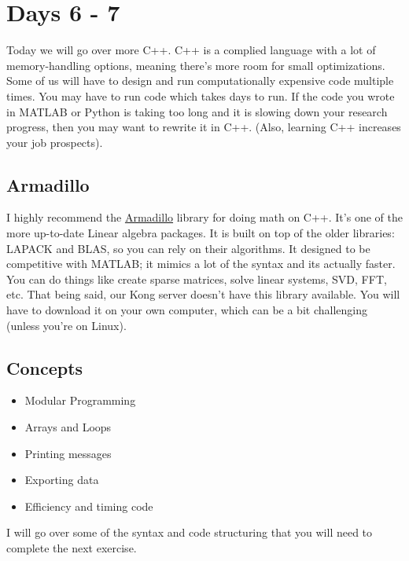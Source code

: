 \documentclass{article}
\begin{document}
\section{Days 6 - 7}
Today we will go over more C++. C++ is a complied language with a lot of memory-handling options, meaning there's more room for small optimizations. Some of us will have to design and run computationally expensive code multiple times. You may have to run code which takes days to run. If the code you wrote in MATLAB or Python is taking too long and it is slowing down your research progress, then you may want to rewrite it in C++. (Also, learning C++ increases your job prospects).

\subsection{Armadillo}
I highly recommend the \href{http://arma.sourceforge.net/}{Armadillo} library for doing math on C++. It's one of the more up-to-date Linear algebra packages. It is built on top of the older libraries: LAPACK and BLAS, so you can rely on their algorithms. It designed to be competitive with MATLAB; it mimics a lot of the syntax and its actually faster. You can do things like create sparse matrices, solve linear systems, SVD, FFT, etc. That being said, our Kong server doesn't have this library available. You will have to download it on your own computer, which can be a bit challenging (unless you're on Linux).

\subsection{Concepts}
\begin{itemize}
    \item Modular Programming
    \item Arrays and Loops
    \item Printing messages
    \item Exporting data
    \item Efficiency and timing code
\end{itemize}
I will go over some of the syntax and code structuring that you will need to complete the next exercise.
\end{document}
